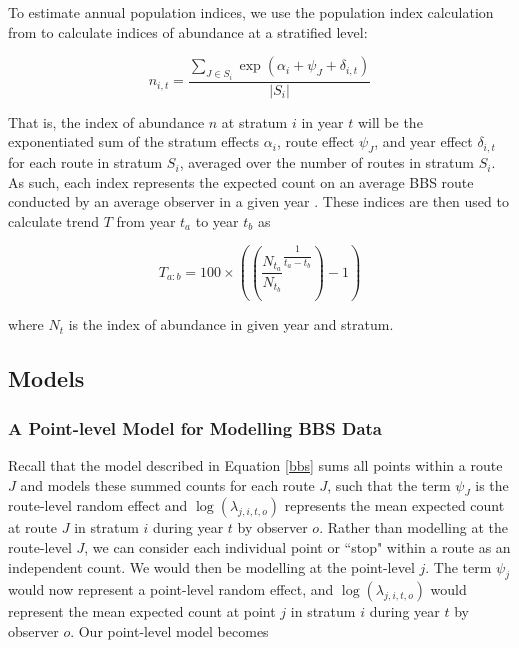 \documentclass[12pt]{article}
\begin{document}
\par To estimate annual population indices, we use the population index calculation from \citet{smith_north_2021} to calculate indices of abundance at a stratified level:

\begin{equation}\label{index}
	n_{i,t} = \dfrac{\sum_{J\in S_i}\exp(\alpha_i + \psi_J + \delta_{i,t})}{|S_i|}
\end{equation}

That is, the index of abundance $n$ at stratum $i$ in year $t$ will be the exponentiated sum of the stratum effects $\alpha_i$, route effect $\psi_J$, and year effect $\delta_{i,t}$ for each route in stratum $S_i$, averaged over the number of routes in stratum $S_i$.
As such, each index represents the expected count on an average BBS route conducted by an average observer in a given year \citep{smith_north_2021}.
These indices are then used to calculate trend $T$ from year $t_a$ to year $t_b$ as

\begin{equation*}
	T_{a:b} = 100 \times \left( \left( \dfrac{N_{t_a}}{N_{t_b}} ^ {\dfrac{1}{t_a - t_b}} \right) - 1 \right)
\end{equation*}

where $N_t$ is the index of abundance in given year and stratum.

\subsection{Models}

\subsubsection{A Point-level Model for Modelling BBS Data}

\par Recall that the model described in Equation \ref{bbs} sums all points within a route $J$ and models these summed counts for each route $J$, such that the term $\psi_J$ is the route-level random effect and $\log(\lambda_{j,i,t,o})$ represents the mean expected count at route $J$ in stratum $i$ during year $t$ by observer $o$.
Rather than modelling at the route-level $J$, we can consider each individual point or ``stop" within a route as an independent count.
We would then be modelling at the point-level $j$.
The term $\psi_j$ would now represent a point-level random effect, and $\log(\lambda_{j,i,t,o})$ would represent the mean expected count at point $j$ in stratum $i$ during year $t$ by observer $o$. 
Our point-level model becomes
\end{document}
